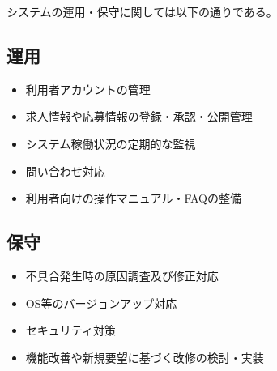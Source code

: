 システムの運用・保守に関しては以下の通りである。
\subsection{運用}
\begin{itemize}
    \item 利用者アカウントの管理
    \item 求人情報や応募情報の登録・承認・公開管理
    \item システム稼働状況の定期的な監視
    \item 問い合わせ対応
    \item 利用者向けの操作マニュアル・FAQの整備
\end{itemize}
\subsection{保守}
\begin{itemize}
    \item 不具合発生時の原因調査及び修正対応
    \item OS等のバージョンアップ対応
    \item セキュリティ対策
    \item 機能改善や新規要望に基づく改修の検討・実装
\end{itemize}
